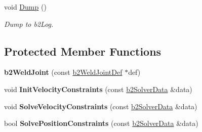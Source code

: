 \begin{DoxyCompactItemize}
\item 
\hypertarget{classb2_weld_joint_a2fd073c5e6264e98592240308a006981}{void \hyperlink{classb2_weld_joint_a2fd073c5e6264e98592240308a006981}{Dump} ()}\label{classb2_weld_joint_a2fd073c5e6264e98592240308a006981}

\begin{DoxyCompactList}\small\item\em Dump to b2\-Log. \end{DoxyCompactList}\end{DoxyCompactItemize}
\subsection*{Protected Member Functions}
\begin{DoxyCompactItemize}
\item 
\hypertarget{classb2_weld_joint_a84dbb52e983d9039eab6ad64ae62d8eb}{{\bfseries b2\-Weld\-Joint} (const \hyperlink{structb2_weld_joint_def}{b2\-Weld\-Joint\-Def} $\ast$def)}\label{classb2_weld_joint_a84dbb52e983d9039eab6ad64ae62d8eb}

\item 
\hypertarget{classb2_weld_joint_aaf86660bd6dc87dc817c7be675b118e4}{void {\bfseries Init\-Velocity\-Constraints} (const \hyperlink{structb2_solver_data}{b2\-Solver\-Data} \&data)}\label{classb2_weld_joint_aaf86660bd6dc87dc817c7be675b118e4}

\item 
\hypertarget{classb2_weld_joint_a5c30276fbd7ad15f2641bc571fd97596}{void {\bfseries Solve\-Velocity\-Constraints} (const \hyperlink{structb2_solver_data}{b2\-Solver\-Data} \&data)}\label{classb2_weld_joint_a5c30276fbd7ad15f2641bc571fd97596}

\item 
\hypertarget{classb2_weld_joint_a21253196937e3f9f6227931dd08d80a3}{bool {\bfseries Solve\-Position\-Constraints} (const \hyperlink{structb2_solver_data}{b2\-Solver\-Data} \&data)}\label{classb2_weld_joint_a21253196937e3f9f6227931dd08d80a3}

\end{DoxyCompactItemize}
